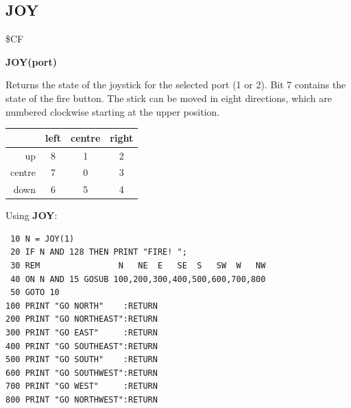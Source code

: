\subsection{JOY}
\begin{description}[leftmargin=2cm,style=nextline]
\item [Token:] \$CF
\item [Format:] {\bf JOY(port)}
\item [Usage:] Returns the state of the
               joystick for the selected port (1 or 2).
               Bit 7 contains the state of the fire button.
               The stick can be moved in eight directions, which
               are numbered clockwise starting at the upper position.
\begin{center}
\ttfamily
{\setlength{\tabcolsep}{1mm}
\begin{tabular}{|r|c|c|c|}
\hline
&  left  & centre & right \\
\hline
up     &  8 &    1  & 2 \\
centre &  7 &    0  & 3 \\
down   &  6 &    5  & 4 \\
\hline
\end{tabular}
}
\end{center}

\item [Example:] Using {\bf JOY}:
\begin{tcolorbox}[colback=black,coltext=white]
\verbatimfont{\codefont}
\begin{verbatim}
 10 N = JOY(1)
 20 IF N AND 128 THEN PRINT "FIRE! ";
 30 REM                N   NE  E   SE  S   SW  W   NW
 40 ON N AND 15 GOSUB 100,200,300,400,500,600,700,800
 50 GOTO 10
100 PRINT "GO NORTH"    :RETURN
200 PRINT "GO NORTHEAST":RETURN
300 PRINT "GO EAST"     :RETURN
400 PRINT "GO SOUTHEAST":RETURN
500 PRINT "GO SOUTH"    :RETURN
600 PRINT "GO SOUTHWEST":RETURN
700 PRINT "GO WEST"     :RETURN
800 PRINT "GO NORTHWEST":RETURN
\end{verbatim}
\end{tcolorbox}
\end{description}


\newpage

